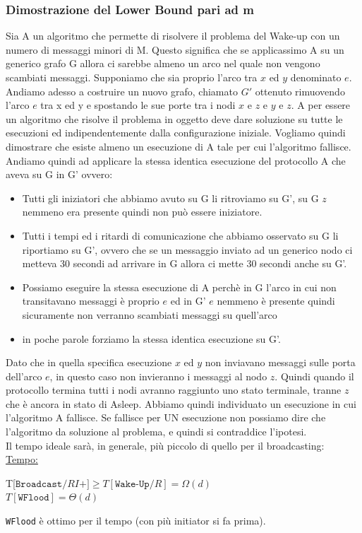 \subsubsection{Dimostrazione del Lower Bound pari ad m}
Sia A un algoritmo che permette di risolvere il problema del Wake-up con un numero di messaggi minori di M. Questo significa che se applicassimo A su un generico grafo G allora ci sarebbe almeno un arco nel quale non vengono scambiati messaggi. Supponiamo che sia proprio l'arco tra $x$ ed $y$ denominato $e$. Andiamo adesso a costruire un nuovo grafo, chiamato $G'$ ottenuto rimuovendo l'arco $e$ tra x ed y e spostando le sue porte tra i nodi $x$ e $z$ e $y$ e $z$. A per essere un algoritmo che risolve il problema in oggetto deve dare soluzione su tutte le esecuzioni ed indipendentemente dalla configurazione iniziale. Vogliamo quindi dimostrare che esiste almeno un esecuzione di A tale per cui l'algoritmo fallisce. Andiamo quindi ad applicare la stessa identica esecuzione del protocollo A che aveva su G in G' ovvero:
\begin{itemize}
    \item Tutti gli iniziatori che abbiamo avuto su G li ritroviamo su G', su G $z$ nemmeno era presente quindi non può essere iniziatore.
    \item Tutti i tempi ed i ritardi di comunicazione che abbiamo osservato su G li riportiamo su G', ovvero che se un messaggio inviato ad un generico nodo ci metteva 30 secondi ad arrivare in G allora ci mette 30 secondi anche su G'.
    \item Possiamo eseguire la stessa esecuzione di A perchè in G l'arco in cui non transitavano messaggi è proprio $e$ ed in G' $e$ nemmeno è presente quindi sicuramente non verranno scambiati messaggi su quell'arco
    \item in poche parole forziamo la stessa identica esecuzione su G'.
\end{itemize}
Dato che in quella specifica esecuzione $x$ ed $y$ non inviavano messaggi sulle porta dell'arco $e$, in questo caso non invieranno i messaggi al nodo $z$. Quindi quando il protocollo termina tutti i nodi avranno raggiunto uno stato terminale, tranne $z$ che è ancora in stato di Asleep. Abbiamo quindi individuato un esecuzione in cui l'algoritmo A fallisce. Se fallisce per UN esecuzione non possiamo dire che l'algoritmo da soluzione al problema, e quindi si contraddice l'ipotesi.\\

Il tempo ideale sarà, in generale, più piccolo di quello per il broadcasting:\\
\underline{Tempo:}
\begin{center}
 T[$\texttt{Broadcast}/RI+] \geq T[\texttt{Wake-Up}/R] = \Omega(d)$\\
  $T[\texttt{WFlood}] = \Theta(d)$\\
\end{center}
\texttt{WFlood} è ottimo per il tempo (con più initiator si fa prima).\\

